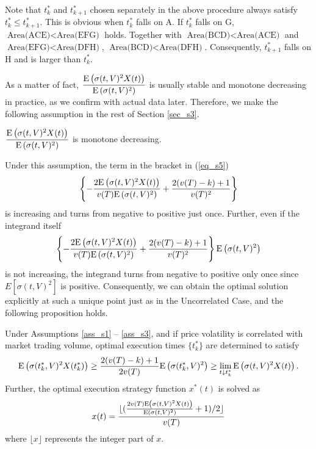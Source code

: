 Note that $t_k^*$ and $t_{k+1}^*$ chosen separately in the above procedure always satisfy $t_k^* \leq t_{k+1}^*$.  This is obvious when $t_k^*$ falls on A.  If $t_k^*$ falls on G, $\mbox{Area(ACE)} < \mbox{Area(EFG)}$ holds.  Together with $\mbox{Area(BCD)} < \mbox{Area(ACE)}$ and $\mbox{Area(EFG)} < \mbox{Area(DFH)}$, $\mbox{Area(BCD)} < \mbox{Area(DFH)}$.  Consequently, $t_{k+1}^*$ falls on H and is larger than $t_k^*$.

As a matter of fact, $\displaystyle \frac{{\mathrm{E}}\left( \sigma(t,V)^2X(t) \right)}{{\mathrm{E}}\left( \sigma(t,V)^2 \right)}$ is usually stable and monotone decreasing in practice, as we confirm with actual data later.  Therefore, we make the following assumption in the rest of Section \ref{sec_s3}.

\begin{assumption}\label{ass_s3}
 \quad $\displaystyle \frac{{\mathrm{E}}\left( \sigma(t,V)^2X(t) \right)}{{\mathrm{E}}\left( \sigma(t,V)^2 \right)}$ is monotone decreasing.
\end{assumption}

Under this assumption, the term in the bracket in (\ref{eq_s5})
\[
  \left\{-\frac{2{\mathrm{E}}\left( \sigma(t,V)^2X(t) \right)}{v(T){\mathrm{E}}\left( \sigma(t,V)^2 \right)}+\frac{2(v(T)-k)+1}{v(T)^2}\right\}
\]
is increasing and turns from negative to positive just once.  Further, even if the integrand itself  
\[
  \left\{-\frac{2{\mathrm{E}}\left( \sigma(t,V)^2X(t) \right)}{v(T){\mathrm{E}}\left( \sigma(t,V)^2 \right)}+\frac{2(v(T)-k)+1}{v(T)^2}\right\}{\mathrm{E}}\left( \sigma(t,V)^2 \right)
\]
is not increasing, the integrand turns from negative to positive only once since $E[\sigma(t,V)^2]$ is positive.  Consequently, we can obtain the optimal solution explicitly at such a unique point just as in the Uncorrelated Case, and the following proposition holds.  

\begin{proposition}\label{prop_s4}
 \quad Under Assumptions \ref{ass_s1} -- \ref{ass_s3}, and if price volatility is correlated with market trading volume, optimal execution times $\{t_k^*\}$ are determined to satisfy 
\[
  {\mathrm{E}}\left( \sigma(t_k^*,V)^2X(t_k^*) \right) \geq \frac{2(v(T)-k)+1}{2v(T)}{\mathrm{E}}\left( \sigma(t_k^*,V)^2 \right) \geq \lim_{t \downarrow t_k^*} {\mathrm{E}}\left( \sigma(t,V)^2X(t) \right).
\]
Further, the optimal execution strategy function $x^*(t)$ is solved as
\[
  x(t)=\frac{\lfloor (\frac{2v(T){\mathrm{E}}\left( \sigma(t,V)^2 X(t) \right)}{{\mathrm{E}}\left( \sigma(t,V)^2 \right)}+1)/2 \rfloor}{v(T)}
\]
where $\lfloor x \rfloor$ represents the integer part of $x$.

\end{proposition}

